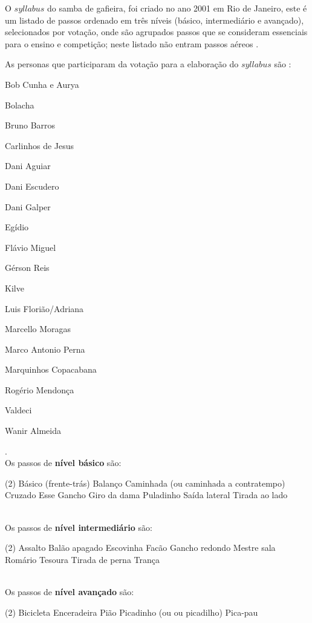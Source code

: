 O $syllabus$  do samba de gafieira, foi criado no ano 2001 em Rio de Janeiro,
este é um listado de passos ordenado em três níveis (básico, intermediário e avançado),
selecionados por votação,
onde são agrupados passos que se consideram essenciais para o ensino e competição;
neste listado não entram passos aéreos \cite[pp. 144]{perna2002samba}.


As personas que participaram da votação para a elaboração do $syllabus$ são \cite[pp. 144]{perna2002samba}:
\begin{inparaitem}[$*$]
\item Bob Cunha e Aurya
\item Bolacha
\item Bruno Barros
\item Carlinhos de Jesus
\item Dani Aguiar
\item Dani Escudero
\item Dani Galper
\item Egídio
\item Flávio Miguel
\item Gérson Reis
\item Kilve
\item Luis Florião/Adriana
\item Marcello Moragas
\item Marco Antonio Perna
\item Marquinhos Copacabana
\item Rogério Mendonça
\item Valdeci
\item Wanir Almeida
\end{inparaitem}.\\



Os passos de \textbf{nível básico} são:
\begin{tasks}(2)
\task Básico (frente-trás)
\task Balanço 
\task Caminhada (ou caminhada a contratempo)
\task Cruzado
\task Esse
\task Gancho
\task Giro da dama
\task Puladinho
\task Saída lateral
\task Tirada ao lado
\end{tasks}~\\


Os passos de \textbf{nível intermediário} são:
\begin{tasks}(2)
\task Assalto
\task Balão apagado
\task Escovinha
\task Facão
\task Gancho redondo
\task Mestre sala
\task Romário
\task Tesoura
\task Tirada de perna
\task Trança
\end{tasks}~\\

Os passos de \textbf{nível avançado} são:
\begin{tasks}(2)
\task Bicicleta
\task Enceradeira
\task Pião
\task Picadinho (ou ou picadilho)
\task Pica-pau
\end{tasks}

